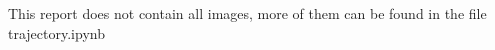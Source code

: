 \documentclass{article}
\begin{document}
This report does not contain all images, more of them can be found in the file trajectory.ipynb



\newpage



\newpage



\newpage



\newpage



\newpage


\end{document}
